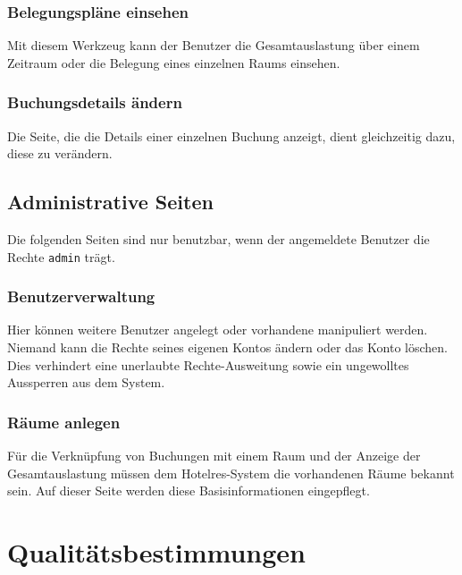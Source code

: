 \documentclass[a4paper,oneside]{scrreprt}
\begin{document}
\subsection*{Belegungspläne einsehen}

Mit diesem Werkzeug kann der Benutzer die Gesamtauslastung über einem Zeitraum oder die Belegung eines einzelnen Raums einsehen.

\subsection*{Buchungsdetails ändern}

Die Seite, die die Details einer einzelnen Buchung anzeigt, dient gleichzeitig dazu, diese zu verändern.


\section{Administrative Seiten}

Die folgenden Seiten sind nur benutzbar, wenn der angemeldete Benutzer die Rechte \texttt{admin} trägt.

\subsection*{Benutzerverwaltung}

Hier können weitere Benutzer angelegt oder vorhandene manipuliert werden. Niemand kann die Rechte seines eigenen Kontos ändern oder das Konto löschen. Dies verhindert eine unerlaubte Rechte-Ausweitung sowie ein ungewolltes Aussperren aus dem System.

\subsection*{Räume anlegen}

Für die Verknüpfung von Buchungen mit einem Raum und der Anzeige der Gesamtauslastung müssen dem Hotelres-System die vorhandenen Räume bekannt sein. Auf dieser Seite werden diese Basisinformationen eingepflegt.


\chapter{Qualitätsbestimmungen}
\end{document}
